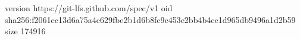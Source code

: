 version https://git-lfs.github.com/spec/v1
oid sha256:f2061ec13d6a75a4c629fbe2b1d6b8fc9c453e2bb4b4ce1d965db9496a1d2b59
size 174916
